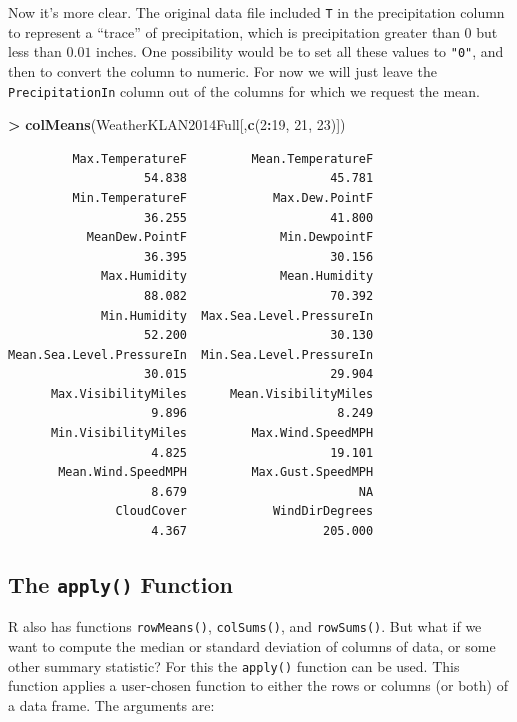 \documentclass[
]{krantz}
\makeatletter
\newenvironment{Shaded}{\begin{snugshade}}{\end{snugshade}}
\newcommand{\DecValTok}[1]{\textcolor[rgb]{0.06,0.06,0.06}{#1}}
\newcommand{\KeywordTok}[1]{\textcolor[rgb]{0.27,0.27,0.27}{\textbf{#1}}}
\newcommand{\NormalTok}[1]{#1}
\newcommand{\OperatorTok}[1]{\textcolor[rgb]{0.43,0.43,0.43}{\textbf{#1}}}
\newcommand{\StringTok}[1]{\textcolor[rgb]{0.5,0.5,0.5}{#1}}
\newenvironment{kframe}{%
\medskip{}
\setlength{\fboxsep}{.8em}
 \def\at@end@of@kframe{}%
 \ifinner\ifhmode%
  \def\at@end@of@kframe{\end{minipage}}%
  \begin{minipage}{\columnwidth}%
 \fi\fi%
 \def\FrameCommand##1{\hskip\@totalleftmargin \hskip-\fboxsep
 \colorbox{shadecolor}{##1}\hskip-\fboxsep
     \hskip-\linewidth \hskip-\@totalleftmargin \hskip\columnwidth}%
 \MakeFramed {\advance\hsize-\width
   \@totalleftmargin\z@ \linewidth\hsize
   \@setminipage}}%
 {\par\unskip\endMakeFramed%
 \at@end@of@kframe}
\renewenvironment{Shaded}{\begin{kframe}}{\end{kframe}}
\makeatother
\begin{document}
Now it's more clear. The original data file included \texttt{T} in the precipitation column to represent a ``trace'' of precipitation, which is precipitation greater than \(0\) but less than \(0.01\) inches. One possibility would be to set all these values to \texttt{"0"}, and then to convert the column to numeric. For now we will just leave the \texttt{PrecipitationIn} column out of the columns for which we request the mean.

\begin{Shaded}
\begin{Highlighting}[]
\OperatorTok{\textgreater{}}\StringTok{ }\KeywordTok{colMeans}\NormalTok{(WeatherKLAN2014Full[,}\KeywordTok{c}\NormalTok{(}\DecValTok{2}\OperatorTok{:}\DecValTok{19}\NormalTok{, }\DecValTok{21}\NormalTok{, }\DecValTok{23}\NormalTok{)])}
\end{Highlighting}
\end{Shaded}

\begin{verbatim}
         Max.TemperatureF         Mean.TemperatureF 
                   54.838                    45.781 
         Min.TemperatureF            Max.Dew.PointF 
                   36.255                    41.800 
           MeanDew.PointF             Min.DewpointF 
                   36.395                    30.156 
             Max.Humidity             Mean.Humidity 
                   88.082                    70.392 
             Min.Humidity  Max.Sea.Level.PressureIn 
                   52.200                    30.130 
Mean.Sea.Level.PressureIn  Min.Sea.Level.PressureIn 
                   30.015                    29.904 
      Max.VisibilityMiles      Mean.VisibilityMiles 
                    9.896                     8.249 
      Min.VisibilityMiles         Max.Wind.SpeedMPH 
                    4.825                    19.101 
       Mean.Wind.SpeedMPH         Max.Gust.SpeedMPH 
                    8.679                        NA 
               CloudCover            WindDirDegrees 
                    4.367                   205.000 
\end{verbatim}

\hypertarget{apply}{%
\subsection{\texorpdfstring{The \texttt{apply()} Function}{The apply() Function}}\label{apply}}

R also has functions \texttt{rowMeans()}, \texttt{colSums()}, and \texttt{rowSums()}. But what if we want to compute the median or standard deviation of columns of data, or some other summary statistic? For this the \texttt{apply()} function can be used. This function applies a user-chosen function to either the rows or columns (or both) of a data frame. The arguments are:
\end{document}

